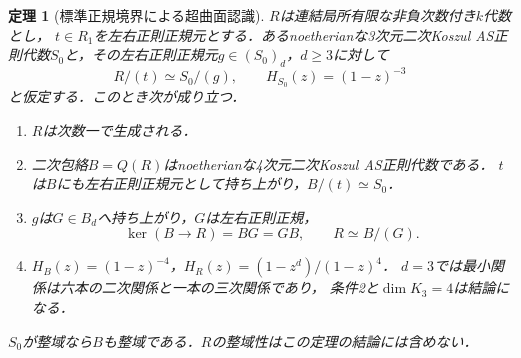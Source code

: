 \documentclass[11pt,a4paper]{ltjsarticle}
\newtheorem{theorem}{定理}[section]
\theoremstyle{definition}\newtheorem{definition}[theorem]{定義}
\begin{document}
\begin{theorem}[標準正規境界による超曲面認識]
\label{thm:normal-boundary-recognition}
$R$は連結局所有限な非負次数付き$k$代数とし，
$t\in R_1$を左右正則正規元とする．あるnoetherianな3次元二次Koszul
AS正則代数$S_0$と，その左右正則正規元$g\in(S_0)_d$，$d\ge3$に対して
\[
 R/(t)\simeq S_0/(g),\qquad H_{S_0}(z)=(1-z)^{-3}
\]
と仮定する．このとき次が成り立つ．
\begin{enumerate}
\item $R$は次数一で生成される．
\item 二次包絡$B=Q(R)$はnoetherianな4次元二次Koszul AS正則代数である．
$t$は$B$にも左右正則正規元として持ち上がり，$B/(t)\simeq S_0$．
\item $g$は$G\in B_d$へ持ち上がり，$G$は左右正則正規，
\[
 \ker(B\to R)=BG=GB,\qquad R\simeq B/(G).
\]
\item $H_B(z)=(1-z)^{-4}$，$H_R(z)=(1-z^d)/(1-z)^4$．
$d=3$では最小関係は六本の二次関係と一本の三次関係であり，
条件2と$\dim K_3=4$は結論になる．
\end{enumerate}
$S_0$が整域なら$B$も整域である．$R$の整域性はこの定理の結論には含めない．
\end{theorem}
\end{document}
